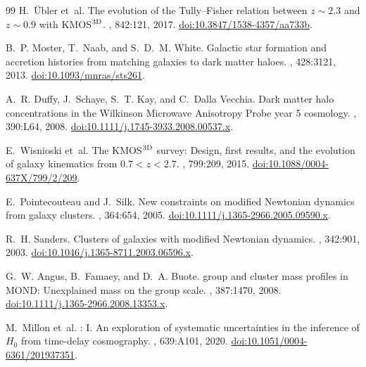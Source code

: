 \documentclass[11pt,a4paper]{article}
\numberwithin{equation}{section}
\numberwithin{table}{section}
\numberwithin{figure}{section}
\begin{document}
\begin{thebibliography}{99}
H.~{\"U}bler et~al.
\newblock The evolution of the {Tully--Fisher} relation between
  $z \sim 2.3$ and $z \sim 0.9$ with {KMOS$^{\rm 3D}$}.
, 842:121, 2017.
  \href{https://doi.org/10.3847/1538-4357/aa733b}{doi:10.3847/1538-4357/aa733b}.

B.~P. Moster, T.~Naab, and S.~D.~M. White.
\newblock Galactic star formation and accretion histories from matching
  galaxies to dark matter haloes.
, 428:3121, 2013.
  \href{https://doi.org/10.1093/mnras/sts261}{doi:10.1093/mnras/sts261}.

A.~R. Duffy, J.~Schaye, S.~T. Kay, and C.~Dalla Vecchia.
\newblock Dark matter halo concentrations in the {Wilkinson Microwave
  Anisotropy Probe} year 5 cosmology.
, 390:L64, 2008.
  \href{https://doi.org/10.1111/j.1745-3933.2008.00537.x}{doi:10.1111/j.1745-3933.2008.00537.x}.

E.~Wisnioski et~al.
\newblock The {KMOS$^{\rm 3D}$} survey: Design, first results, and the
  evolution of galaxy kinematics from $0.7 < z < 2.7$.
, 799:209, 2015.
  \href{https://doi.org/10.1088/0004-637X/799/2/209}{doi:10.1088/0004-637X/799/2/209}.

E.~Pointecouteau and J.~Silk.
\newblock New constraints on modified {Newtonian} dynamics from galaxy
  clusters.
, 364:654, 2005.
  \href{https://doi.org/10.1111/j.1365-2966.2005.09590.x}{doi:10.1111/j.1365-2966.2005.09590.x}.

R.~H. Sanders.
\newblock Clusters of galaxies with modified {Newtonian} dynamics.
, 342:901, 2003.
  \href{https://doi.org/10.1046/j.1365-8711.2003.06596.x}{doi:10.1046/j.1365-8711.2003.06596.x}.

G.~W. Angus, B.~Famaey, and D.~A. Buote.
 group and cluster mass profiles in {MOND}: Unexplained
  mass on the group scale.
, 387:1470, 2008.
  \href{https://doi.org/10.1111/j.1365-2966.2008.13353.x}{doi:10.1111/j.1365-2966.2008.13353.x}.

M.~Millon et~al.
: I. {An exploration of systematic uncertainties} in
  the inference of $H_0$ from time-delay cosmography.
, 639:A101, 2020.
  \href{https://doi.org/10.1051/0004-6361/201937351}{doi:10.1051/0004-6361/201937351}.


\end{thebibliography}
\end{document}

